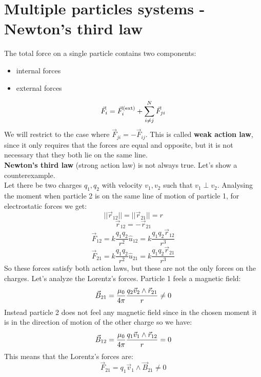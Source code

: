 \section{Multiple particles systems - Newton's third law}
The total force on a single particle contains two components:
\begin{itemize}
    \item internal forces
    \item external forces
\end{itemize}
\begin{equation}
    \vec{F}_i = \vec{F}_i^{(\mathrm{ext})} + \displaystyle\sum_{i\neq j}^{N}\vec{F}_{ji}
\end{equation}
We will restrict to the case where $\vec{F}_{ji} = -\vec{F}_{ij}$. This is called \textbf{weak action law}, since it only requires that the forces are equal and opposite, but it is not necessary that they both lie on the same line.\\
\textbf{Newton's third law} (strong action law) is not always true. Let's show a counterexample.\\
Let there be two charges $q_1,q_2$ with velocity $v_1,v_2$ such that $v_1\perp v_2$. Analysing the moment when particle 2 is on the same line of motion of particle 1, for electrostatic forces we get:
\[||\vec{r}_{12}|| = ||\vec{r}_{21}|| = r\]
\[\vec{r}_{12} = - \vec{r}_{21}\]
\begin{equation}
    \vec{F}_{12} = k\dfrac{q_1q_2}{r^2}\hat{u}_{12} = k\dfrac{q_1q_2 \vec{r}_{12}}{r^3}
\end{equation}
\begin{equation}
    \vec{F}_{21} = k\dfrac{q_1q_2}{r^2}\hat{u}_{21} = k\dfrac{q_1q_2 \vec{r}_{21}}{r^3}
\end{equation}
So these forces satisfy both action laws, but these are not the only forces on the charges. Let's analyze the Lorentz's forces. Particle 1 feels a magnetic field:
\begin{equation}
    \vec{B}_{21} = \dfrac{\mu_0}{4\pi}\dfrac{q_2\vec{v}_2\wedge\vec{r}_{21}}{r} \neq 0
\end{equation}
Instead particle 2 does not feel any magnetic field since in the chosen moment it is in the direction of motion of the other charge so we have:
\begin{equation}
    \vec{B}_{12} = \dfrac{\mu_0}{4\pi}\dfrac{q_1\vec{v}_1\wedge\vec{r}_{12}}{r} = 0
\end{equation}
This means that the Lorentz's forces are:
\begin{equation}
    \vec{F}_{21} = q_1\vec{v}_1\wedge\vec{B}_{21} \neq 0
\end{equation}
